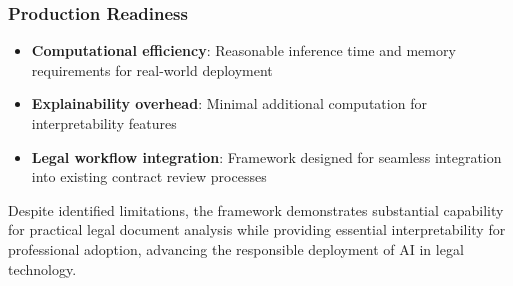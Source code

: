 \subsubsection{Production Readiness}
\begin{itemize}
\item \textbf{Computational efficiency}: Reasonable inference time and memory requirements for real-world deployment
\item \textbf{Explainability overhead}: Minimal additional computation for interpretability features
\item \textbf{Legal workflow integration}: Framework designed for seamless integration into existing contract review processes
\end{itemize}

Despite identified limitations, the framework demonstrates substantial capability for practical legal document analysis while providing essential interpretability for professional adoption, advancing the responsible deployment of AI in legal technology.
